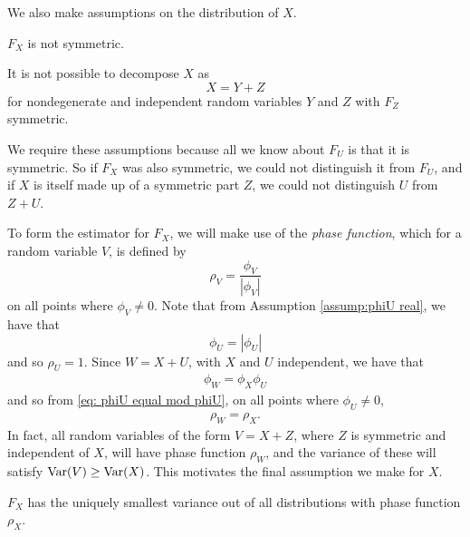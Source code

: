 	We also make assumptions on the distribution of $X$. 
	\begin{assumption}
	\label{assumpt: X not symmetric}
		$F_X$ is not symmetric.
	\end{assumption}
	\begin{assumption}
		\label{assump: X indecomposable}
		It is not possible to decompose $X$ as
		\begin{equation}
			X = Y + Z
		\end{equation}
		for nondegenerate and independent random variables $Y$ and $Z$ with $F_Z$ symmetric.
	\end{assumption}

	We require these assumptions because all we know about $F_U$ is that it is symmetric. So if $F_X$ was also symmetric, we could not distinguish it from $F_U$, and if $X$ is itself made up of a symmetric part $Z$, we could not distinguish $U$ from $Z+U$.


	To form the estimator for $F_X$, we will make use of the \emph{phase function}, which for a random variable $V$, is defined by
	\begin{equation}
		\rho_V = \frac{\phi_V}{|\phi_V|}
	\end{equation}
	on all points where $\phi_V \neq 0$.
	Note that from Assumption \ref{assump:phiU real}, we have that 
	\begin{equation}
	\label{eq: phiU equal mod phiU}
		\phi_U = |\phi_U|
	\end{equation}
	and so $\rho_U = 1$.
	Since $W = X+U$, with $X$ and $U$ independent, we have that
	\begin{align}
		\phi_W = \phi_X \phi_U
	\end{align}
	and so from \eqref{eq: phiU equal mod phiU}, on all points where $\phi_U \neq 0$,
	\begin{align}
		\rho_W = \rho_X.
	\end{align}
	In fact, all random variables of the form $V = X + Z$, where $Z$ is symmetric and independent of $X$, will have phase function $\rho_W$, and the variance of these will satisfy $\mathrm{Var}(V) \geq \mathrm{Var}(X)$. This motivates the final assumption we make for $X$.

	\begin{assumption}
	\label{assump:X has smallest variance}
		$F_X$ has the uniquely smallest variance out of all distributions with phase function $\rho_X$.
	\end{assumption}

